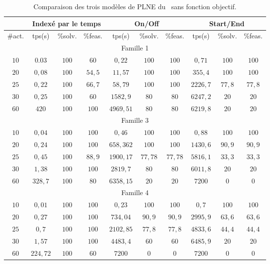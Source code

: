 \begin{table}[ht] \centering
  \begin{tabular}{|c|ccc|ccc|ccc|}
\hline & \multicolumn{3}{c}{Indexé par le temps} & \multicolumn{3}{|c}{On/Off} & \multicolumn{3}{|c|}{Start/End}\\ \hline
\#act. & tps(s) & \%solv. &
\%feas. & tps(s) & \%solv. &
\%feas. & tps(s) & \%solv. &
\%feas. \\ \hline 
    \multicolumn{10}{|c|}{Famille 1}\\
    \hline
   $ 10	$&$	0.03	$&$	100	$& $60$& $0,22$ & $100$ & $100$&$	0,71	$&$	100	$&$	100$	\\
   $ 20	$&$	0,08	$&$	100	$&$	54,5	$& $11,57$ & $100$ & $100$&$	355,4	$&$	100	$&$	100$	\\
    $25	$&$	0,22	$&$	100	$&$	66,7	$&$58,79$ & $100$ & $100	$&$	2226,7	$&$	77,8	$&$	77,8$	\\
    $30	$&$	0,25	$&$	100	$&$	60	$& $1582,9$ &
                                                                     $80$ & $80 $&$	6247,2	$&$	20	$&$	20$	\\
    $60	$&$	420	$&$	100	$&$	100	$&$4969,51$ & $80$ & $80	$&$	6219,8	$&$	20	$&$	20$	\\
    \hline 
    \multicolumn{10}{|c|}{Famille 3}\\
    \hline
   $ 10	$&$	0,04	$&$	100	$&$	100	$&$0,46$ & $100$ & $100$&$0,88	$&$	100	$&$	100$	\\
   $ 20	$&$	0,24	$&$	100	$&$	100	$&$658,362$ & $100$ & $100$&$	1430,6	$&$	90,9	$&$	90,9$	\\
   $ 25	$&$	0,45	$&$	100	$&$	88,9	$&$	1900,17$ & $77,78$ & $77,78	$&$	5816,1	$&$	33,3	$&$	33,3$	\\
   $ 30	$&$	1,38	$&$	100	$&$	100	$&$	2819,7$ & $80$ & $80$&$	6011,8	$&$	20	$&$	20$	\\
  $  60	$&$	328,7	$&$	100	$&$	80	$&$6358,15$ & $20$ & $20$&$	7200	$&$	0	$&$	0$	\\
    \hline 
    \multicolumn{10}{|c|}{Famille 4}\\
    \hline
   $ 10	$&$	0,01	$&$	100	$&$	100	$&$	0,23	$&$	100	$&$	100	$&$	0,7	$&$	100	$&$	100$	\\
  $  20	$&$	0,27	$&$	100	$&$	100	$&$	734,04	$&$	90,9	$&$	90,9	$&$	2995,9	$&$	63,6	$&$	63,6$	\\
   $ 25	$&$	0,7	$&$	100	$&$	100	$&$	2102,85	$&$	77,8	$&$	77,8	$&$	4833,6	$&$	44,4	$&$	44,4$	\\
   $ 30	$&$	1,57	$&$	100	$&$	100	$&$	4483,4	$&$	60	$&$	60	$&$	6485,9	$&$	20	$&$	20$	\\
   $ 60	$&$	224,72	$&$	100	$&$	60	$&$	7200	$&$	0	$&$	0	$&$	7200	$&$	0	$&$	0$	\\
    \hline
  \end{tabular}
  \caption{Comparaison des trois modèles de PLNE du \CECSP~sans
    fonction objectif.}
  \label{MIPresult}
\end{table} 

